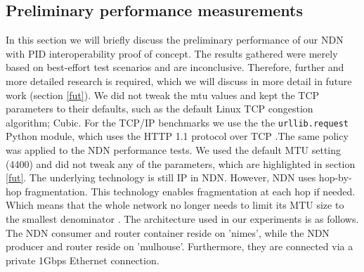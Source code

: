 \subsection{Preliminary performance measurements}
\label{discussion-performance}
In this section we will briefly discuss the preliminary performance of our NDN with PID interoperability proof of concept. The results gathered were merely based on best-effort test scenarios and are inconclusive. Therefore, further and more detailed research is required, which we will discuss in more detail in future work (section \ref{fut}). We did not tweak the \gls{mtu} values and kept the TCP parameters to their defaults, such as the default Linux TCP congestion algorithm; Cubic. For the TCP/IP benchmarks we use the the \texttt{urllib.request} Python module, which uses the HTTP 1.1 protocol over TCP \cite{urllib}.The same policy was applied to the NDN performance tests. We used the default MTU setting (4400) and did not tweak any of the parameters, which are highlighted in section \ref{fut}. The underlying technology is still IP in NDN. However, NDN uses hop-by-hop fragmentation. This technology enables  fragmentation at each hop if needed. Which means that the whole network no longer
needs to limit its MTU size to the smallest denominator \cite{ndn-mtu}.
The architecture used in our experiments is as follows. The NDN consumer and router container reside on 'nimes', while the NDN producer and router reside on 'mulhouse'. Furthermore, they are connected via a private 1Gbps Ethernet connection.
